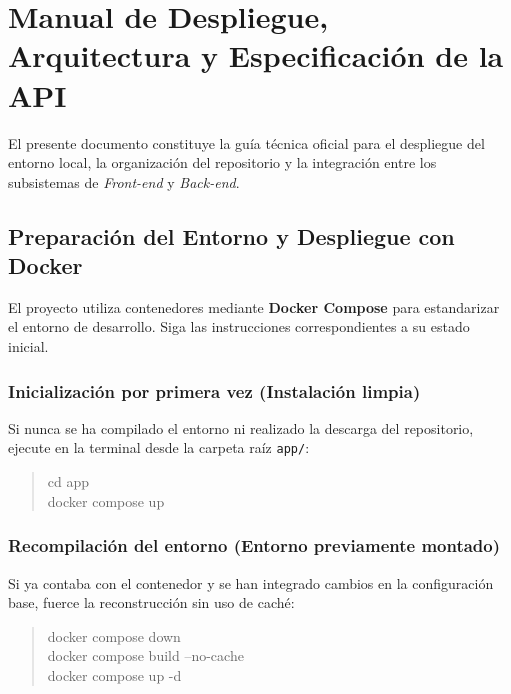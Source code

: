 

\section{Manual de Despliegue, Arquitectura y Especificación de la API}
\label{sec:guia-tecnica-app}

El presente documento constituye la guía técnica oficial para el despliegue del entorno local, la organización del repositorio y la integración entre los subsistemas de \textit{Front-end} y \textit{Back-end}.

\subsection{Preparación del Entorno y Despliegue con Docker}

El proyecto utiliza contenedores mediante \textbf{Docker Compose} para estandarizar el entorno de desarrollo. Siga las instrucciones correspondientes a su estado inicial.

\subsubsection{Inicialización por primera vez (Instalación limpia)}
Si nunca se ha compilado el entorno ni realizado la descarga del repositorio, ejecute en la terminal desde la carpeta raíz \texttt{app/}:

\begin{quote}
\small\ttfamily
cd app\\
docker compose up
\end{quote}

\subsubsection{Recompilación del entorno (Entorno previamente montado)}
Si ya contaba con el contenedor y se han integrado cambios en la configuración base, fuerce la reconstrucción sin uso de caché:

\begin{quote}
\small\ttfamily
docker compose down\\
docker compose build --no-cache\\
docker compose up -d
\end{quote}

